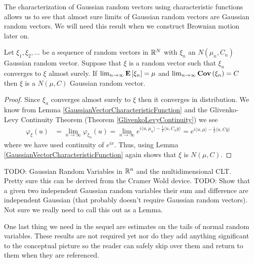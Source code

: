The characterization of Gaussian random vectors using characteristic
functions allows us to see that almost sure limits of Gaussian random vectors are
Gaussian random vectors.  We will need this result when we construct
Brownian motion later on.
\begin{lem}\label{LimitOfGaussianRandomVectors}Let $\xi_1, \xi_2, \dots$ be a sequence of random
  vectors in $\mathbb{R}^N$ with $\xi_n$ an $N(\mu_n, C_n)$ Gaussian
  random vector.  Suppose that $\xi$ is a random vector such
  that $\xi_n$ converges to $\xi$ almost surely.  If $\lim_{n \to
    \infty} \textbf{E}\left[\xi_n\right] = \mu$ and $\lim_{n \to \infty}
  \textbf{Cov} \left (\xi_n \right ) = C$ then $\xi$ is a $N(\mu, C)$ Gaussian random vector.
\end{lem}
\begin{proof}
Since $\xi_n$ converges almost surely to $\xi$ then it converges in
distribution.  We know from Lemma
\ref{GaussianVectorCharacteristicFunction} and the Glivenko-Levy
Continuity Theorem (Theorem \ref{GlivenkoLevyContinuity}) we see
\begin{align*}
\varphi_\xi(u) &= \lim_{n \to \infty} \varphi_{\xi_n}(u) = \lim_{n \to
  \infty} e^{i\langle u, \mu_n\rangle - \frac{1}{2}\langle u, C_n
  y\rangle} = e^{i\langle u, \mu\rangle - \frac{1}{2}\langle u, C
  y\rangle} 
\end{align*}
where we have used continuity of $e^{ix}$.  Thus, using Lemma
\ref{GaussianVectorCharacteristicFunction}
again shows that $\xi$ is $N(\mu, C)$.
\end{proof}

TODO: Gaussian Random Variables in $\mathbb{R}^n$ and the multidimensional
CLT.  Pretty sure this can be derived from the Cramer Wold device.
TODO: Show that a
given two independent Gaussian random variables their sum and
difference are independent Gaussian (that probably doesn't require
Gaussian random vectors).  Not sure we really need to call this out as a Lemma.

One last thing we need in the sequel are estimates on the tails of
normal random variables.  These results are not required yet nor do
they add anything significant to the conceptual picture so the
reader can safely skip over them and return to them when they are
referenced.

